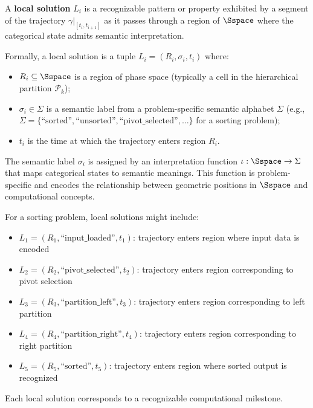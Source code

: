 \begin{definition}
\label{def:local_solution}
A \textbf{local solution} $L_i$ is a recognizable pattern or property exhibited by a segment of the trajectory $\gamma|_{[t_i, t_{i+1}]}$ as it passes through a region of $\Sspace$ where the categorical state admits semantic interpretation. 

Formally, a local solution is a tuple $L_i = (R_i, \sigma_i, t_i)$ where:
\begin{itemize}
    \item $R_i \subseteq \Sspace$ is a region of phase space (typically a cell in the hierarchical partition $\mathcal{P}_k$);
    \item $\sigma_i \in \Sigma$ is a semantic label from a problem-specific semantic alphabet $\Sigma$ (e.g., $\Sigma = \{\text{``sorted''}, \text{``unsorted''}, \text{``pivot\_selected''}, \ldots\}$ for a sorting problem);
    \item $t_i$ is the time at which the trajectory enters region $R_i$.
\end{itemize}

The semantic label $\sigma_i$ is assigned by an interpretation function $\iota: \Sspace \to \Sigma$ that maps categorical states to semantic meanings. This function is problem-specific and encodes the relationship between geometric positions in $\Sspace$ and computational concepts.
\end{definition}

\begin{example}
\label{ex:sorting_local}
For a sorting problem, local solutions might include:
\begin{itemize}
    \item $L_1 = (R_1, \text{``input\_loaded''}, t_1)$: trajectory enters region where input data is encoded
    \item $L_2 = (R_2, \text{``pivot\_selected''}, t_2)$: trajectory enters region corresponding to pivot selection
    \item $L_3 = (R_3, \text{``partition\_left''}, t_3)$: trajectory enters region corresponding to left partition
    \item $L_4 = (R_4, \text{``partition\_right''}, t_4)$: trajectory enters region corresponding to right partition
    \item $L_5 = (R_5, \text{``sorted''}, t_5)$: trajectory enters region where sorted output is recognized
\end{itemize}
Each local solution corresponds to a recognizable computational milestone.
\end{example}

